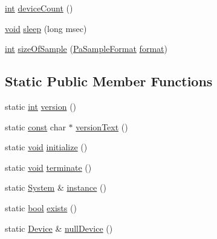 \begin{DoxyCompactItemize}
\item 
\hyperlink{xmltok_8h_a5a0d4a5641ce434f1d23533f2b2e6653}{int} \hyperlink{classportaudio_1_1_system_a6caacefe7e4e4ba1237f4c669c01f897}{device\+Count} ()
\item 
\hyperlink{sound_8c_ae35f5844602719cf66324f4de2a658b3}{void} \hyperlink{classportaudio_1_1_system_ade1d243e5bf979f63b0a32db64cf42e4}{sleep} (long msec)
\item 
\hyperlink{xmltok_8h_a5a0d4a5641ce434f1d23533f2b2e6653}{int} \hyperlink{classportaudio_1_1_system_abf122b3e224eb5712654008d55dddad2}{size\+Of\+Sample} (\hyperlink{portaudio_8h_a4582d93c2c2e60e12be3d74c5fe00b96}{Pa\+Sample\+Format} \hyperlink{_export_p_c_m_8cpp_a317afff57d87a89158c2b038d37b2b08}{format})
\end{DoxyCompactItemize}
\subsection*{Static Public Member Functions}
\begin{DoxyCompactItemize}
\item 
static \hyperlink{xmltok_8h_a5a0d4a5641ce434f1d23533f2b2e6653}{int} \hyperlink{classportaudio_1_1_system_a9aef78d18d05f4577976db4e84005d62}{version} ()
\item 
static \hyperlink{getopt1_8c_a2c212835823e3c54a8ab6d95c652660e}{const} char $\ast$ \hyperlink{classportaudio_1_1_system_a638193e901c3171260a3d27014db6950}{version\+Text} ()
\item 
static \hyperlink{sound_8c_ae35f5844602719cf66324f4de2a658b3}{void} \hyperlink{classportaudio_1_1_system_acc01c2860b8c61bbac130761b4b5f9c5}{initialize} ()
\item 
static \hyperlink{sound_8c_ae35f5844602719cf66324f4de2a658b3}{void} \hyperlink{classportaudio_1_1_system_ac54f9502c074df4593e481aa0d95f1c2}{terminate} ()
\item 
static \hyperlink{classportaudio_1_1_system}{System} \& \hyperlink{classportaudio_1_1_system_a460800fc5a870298eb4d3f281253ddf4}{instance} ()
\item 
static \hyperlink{mac_2config_2i386_2lib-src_2libsoxr_2soxr-config_8h_abb452686968e48b67397da5f97445f5b}{bool} \hyperlink{classportaudio_1_1_system_a7a9b8a049e8398e1b586c76a0a4293fb}{exists} ()
\item 
static \hyperlink{classportaudio_1_1_device}{Device} \& \hyperlink{classportaudio_1_1_system_a997eda6fef320339b92c6205b4221c48}{null\+Device} ()
\end{DoxyCompactItemize}


